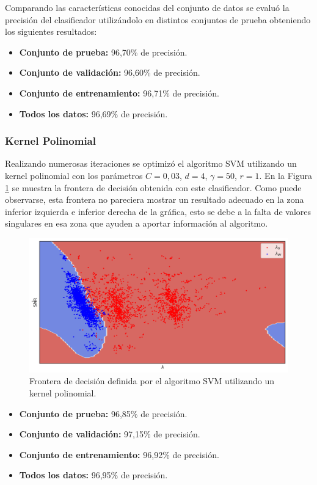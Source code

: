 Comparando las características conocidas del conjunto de datos se evaluó la precisión del clasificador utilizándolo en distintos conjuntos de prueba obteniendo los siguientes resultados:
\begin{itemize}
  \item \textbf{Conjunto de prueba:} 96,70\% de precisión.
  \item \textbf{Conjunto de validación:} 96,60\% de precisión.
  \item \textbf{Conjunto de entrenamiento:} 96,71\% de precisión.
  \item \textbf{Todos los datos:} 96,69\% de precisión.
\end{itemize}

\subsubsection{Kernel Polinomial}
Realizando numerosas iteraciones se optimizó el algoritmo SVM utilizando un kernel polinomial con los parámetros $C=0,03$, $d=4$, $\gamma=50$, $r=1$. En la Figura \ref{fig:ml_svm_poly} se muestra la frontera de decisión obtenida con este clasificador. Como puede observarse, esta frontera no pareciera mostrar un resultado adecuado en la zona inferior izquierda e inferior derecha de la gráfica, esto se debe a la falta de valores singulares en esa zona que ayuden a aportar información al algoritmo.

\begin{figure}[ht!]
  \centering
  \includegraphics[width=0.9\linewidth]{images/05-Machine Learning/ml_svm_poly.png}
  \caption{Frontera de decisión definida por el algoritmo SVM utilizando un kernel polinomial.}
  \label{fig:ml_svm_poly}
\end{figure}

\begin{itemize}
  \item \textbf{Conjunto de prueba:} 96,85\% de precisión.
  \item \textbf{Conjunto de validación:} 97,15\% de precisión.
  \item \textbf{Conjunto de entrenamiento:} 96,92\% de precisión.
  \item \textbf{Todos los datos:} 96,95\% de precisión.
\end{itemize}

